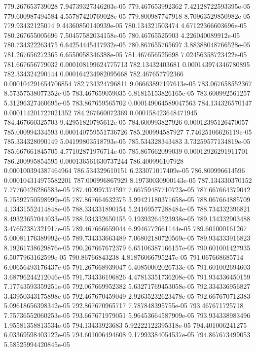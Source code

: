 {779.267653739028 7.94739327346203e-05
779.467653992362 7.42128722593395e-05
779.600987494584 4.55787420769028e-05
779.800987747918 8.70963529850982e-05
779.93432125014 9.44360850140939e-05
780.134321503474 4.67122366603696e-05
780.267655005696 7.50457582034158e-05
780.46765525903 4.226040089912e-05
780.734322263475 6.64254445417932e-05
780.867655765697 3.88388048766528e-05
781.267656272365 6.6550058346388e-05
781.467656525698 7.02456358723422e-05
781.667656779032 0.000108199624775713
782.13432403681 0.000143974346780895
782.334324290144 0.000164234982095668
782.467657792366 0.000104291654706854
782.734324796811 9.06663897197613e-05
783.067658552367 8.57357538077352e-05
783.467659059035 6.81815153826165e-05
783.600992561257 5.31296327460695e-05
783.867659565702 0.000149064589047563
784.134326570147 0.000114201727021352
784.267660072369 0.000158423648471945
784.467660325703 9.42951820795612e-05
784.600993827926 0.00012395126470057
785.000994334593 0.000140759551736726
785.200994587927 7.74625106626119e-05
785.334328090149 5.04199803518793e-05
785.534328343483 3.73259577134819e-05
785.667661845705 4.77102871976714e-05
785.867662099039 0.00012926291911701
786.200995854595 0.000136561630737244
786.400996107928 0.000100394387464964
786.534329610151 6.233071017409e-05
786.800996614596 0.000104314975582201
787.000996867929 8.19730030900143e-05
787.134330370152 7.77760426286583e-05
787.400997374597 7.66759487710723e-05
787.667664379042 5.75592750598999e-05
787.867664632375 3.99421180371658e-05
788.067664885709 4.13431552414848e-05
788.334331890154 5.24169577288484e-05
788.734332396821 8.49323657044033e-05
788.934332650155 9.19393264523938e-05
789.134332903488 3.47652387321917e-05
789.467666659044 6.9946772661144e-05
789.601000161267 5.00081176389992e-05
789.734333663489 7.06802180720569e-05
789.934333916823 8.19261738629876e-05
790.267667672379 6.65106387166157e-05
790.601001427935 6.5077963162599e-05
790.86766843238 4.81876066795247e-05
791.067668685714 6.00656493176437e-05
791.267668939047 6.40850002026733e-05
791.601002694603 3.68796244212046e-05
791.734336196826 4.47813351736208e-05
791.934336450159 7.17743593359251e-05
792.067669952382 5.63271769453058e-05
792.334336956827 3.43950343175898e-05
792.467670459049 2.92635232623478e-05
792.667670712383 5.09618656398342e-05
792.867670965717 7.787848395755e-05
793.467671725718 7.75736552060253e-05
793.667671979051 5.96453664587909e-05
793.934338983496 1.95581358813534e-05
794.13433923683 5.92222122395318e-05
794.401006241275 6.03369598403122e-05
794.601006494608 9.17993384054537e-05
794.867673499053 5.58525994420845e-05
}

